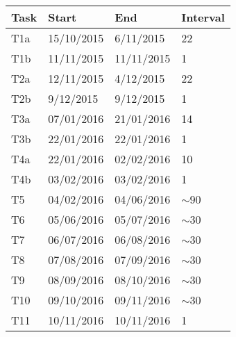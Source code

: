\begin{center}
	\begin{tabulary}{\linewidth\tymin=70pt}{Y{1cm}|Y{3cm}|Y{3cm}|Y{1.7cm}}
		\textbf{Task} & \textbf{Start} & \textbf{End} & \textbf{Interval} \\ \hline
		T1a & 15/10/2015 & 6/11/2015 & 22\\ \hline
		T1b & 11/11/2015 & 11/11/2015 & 1\\ \hline
		T2a & 12/11/2015 & 4/12/2015 & 22\\ \hline
		T2b & 9/12/2015 & 9/12/2015 & 1\\ \hline
		T3a & 07/01/2016 & 21/01/2016 & 14\\ \hline
		T3b & 22/01/2016 & 22/01/2016 & 1\\ \hline
		T4a & 22/01/2016 & 02/02/2016 & 10\\ \hline
		T4b & 03/02/2016 & 03/02/2016 & 1\\ \hline
		T5 & 04/02/2016 & 04/06/2016 & $\sim$90\\ \hline
		T6 & 05/06/2016 & 05/07/2016 & $\sim$30\\ \hline
		T7 & 06/07/2016 & 06/08/2016 & $\sim$30\\ \hline
		T8 & 07/08/2016 & 07/09/2016 & $\sim$30\\ \hline
		T9 & 08/09/2016 & 08/10/2016 & $\sim$30\\ \hline
		T10 & 09/10/2016 & 09/11/2016 & $\sim$30\\ \hline
		T11 & 10/11/2016 & 10/11/2016 & 1\\
	\end{tabulary}
\end{center}
%
